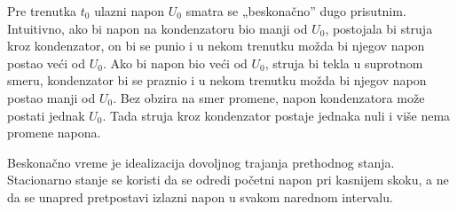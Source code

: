 Pre trenutka $t_0$ ulazni napon $U_0$ smatra se „beskonačno” dugo prisutnim. Intuitivno, ako bi napon na kondenzatoru bio manji od $U_0$, postojala bi struja kroz kondenzator, on bi se punio i u nekom trenutku možda bi njegov napon postao veći od $U_0$. Ako bi napon bio veći od $U_0$, struja bi tekla u suprotnom smeru, kondenzator bi se praznio i u nekom trenutku možda bi njegov napon postao manji od $U_0$. Bez obzira na smer promene, napon kondenzatora može postati jednak $U_0$. Tada struja kroz kondenzator postaje jednaka nuli i više nema promene napona.

Beskonačno vreme je idealizacija dovoljnog trajanja prethodnog stanja. Stacionarno stanje se koristi da se odredi početni napon pri kasnijem skoku, a ne da se unapred pretpostavi izlazni napon u svakom narednom intervalu.
